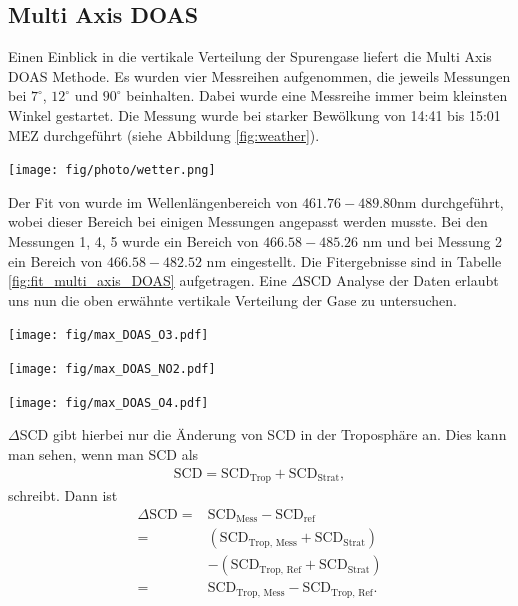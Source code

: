 \documentclass[12pt, a4paper, bibliography=totoc]{scrartcl}
\begin{document}
\begin{multicols}{2}
\subsection{Multi Axis DOAS}\label{ssec:multi_axis_DOAS}

Einen Einblick in die vertikale Verteilung der Spurengase liefert die Multi Axis DOAS Methode.
Es wurden vier Messreihen aufgenommen, die jeweils Messungen bei $7^\circ$, $12^\circ$ und $90^\circ$ beinhalten. 
Dabei wurde eine Messreihe immer beim kleinsten Winkel gestartet.
Die Messung wurde bei starker Bewölkung von 14:41 bis 15:01 MEZ durchgeführt (siehe Abbildung \ref{fig:weather}).

\begin{center}
	\texttt{[image: fig/photo/wetter.png]}
	\label{fig:weather}
\end{center} 

Der Fit von  wurde im Wellenlängenbereich von $461.76 - 489.80$\si{nm} durchgeführt, wobei dieser Bereich bei einigen Messungen angepasst werden musste. 
Bei den Messungen 1, 4, 5 wurde ein Bereich von $466.58 - 485.26$ \si{nm} und bei Messung 2 ein Bereich von $466.58 - 482.52$ \si{nm} eingestellt.
Die Fitergebnisse sind in Tabelle \ref{fig:fit_multi_axis_DOAS} aufgetragen.
Eine $\Delta \text{SCD}$ Analyse der Daten erlaubt uns nun die oben erwähnte vertikale Verteilung der Gase zu untersuchen.

\begin{center}
	\texttt{[image: fig/max\_DOAS\_O3.pdf]}
	\label{fig:max_doas_o3}
\end{center}

\begin{center}
	\texttt{[image: fig/max\_DOAS\_NO2.pdf]}
	\label{fig:max_doas_no2}
\end{center}

\begin{center}
	\texttt{[image: fig/max\_DOAS\_O4.pdf]}
	\label{fig:max_doas_o4}
\end{center}

$\Delta$SCD gibt hierbei nur die Änderung von SCD in der Troposphäre an.
Dies kann man sehen, wenn man SCD als
\begin{align}
    \text{SCD} = \text{SCD}_\text{Trop} + \text{SCD}_\text{Strat},
\end{align}
schreibt.
Dann ist 
\begin{align}
\Delta\text{SCD} =& \text{SCD}_{\text{Mess}} - \text{SCD}_\text{ref} \\
    =& (\text{SCD}_{\text{Trop, \ Mess}} + \text{SCD}_{\text{Strat}}) \\
    & - (\text{SCD}_{\text{Trop, \ Ref}} + \text{SCD}_{\text{Strat}}) \\
    =& \text{SCD}_{\text{Trop, \ Mess}} - \text{SCD}_{\text{Trop, \ Ref}}. \label{eq:SCD_trop}
\end{align}


\end{multicols}
\end{document}
